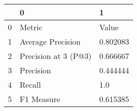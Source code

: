 \begin{tabular}{lll}
\toprule
{} &                     0 &         1 \\
\midrule
0 &                Metric &     Value \\
1 &     Average Precision &  0.802083 \\
2 &  Precision at 3 (P@3) &  0.666667 \\
3 &             Precision &  0.444444 \\
4 &                Recall &       1.0 \\
5 &            F1 Measure &  0.615385 \\
\bottomrule
\end{tabular}
